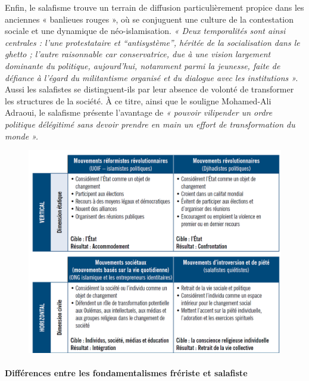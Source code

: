 Enfin, le salafisme trouve un terrain de diffusion particulièrement
propice dans les anciennes « banlieues rouges », où se conjuguent une
culture de la contestation sociale et une dynamique de néo-islamisation.
\emph{« Deux temporalités sont ainsi centrales : l'une protestataire et
``antisystème'', héritée de la socialisation dans le ghetto ; l'autre
raisonnable car conservatrice, due à une vision largement dominante du
politique, aujourd'hui, notamment parmi la jeunesse, faite de défiance à
l'égard du militantisme organisé et du dialogue avec les institutions
»}\emph{.} Aussi les salafistes se distinguent-ils par leur absence de
volonté de transformer les structures de la société. À ce titre, ainsi
que le souligne Mohamed-Ali Adraoui, le salafisme présente l'avantage de
\emph{« pouvoir vilipender un ordre politique délégitimé sans devoir
prendre en main un effort de transformation du monde »}\emph{.}



\begin{figure}
    \centering
    \includegraphics[width=\textwidth]{ImageIslamFrance/MouvementsIslamiques.png}

    \label{fig:mouvementsIslamiques}
\end{figure}

\paragraph{Différences entre les fondamentalismes frériste et
salafiste}

